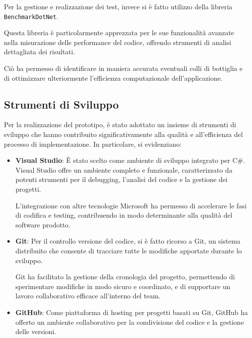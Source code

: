 \documentclass[12pt,a4paper,openright,twoside]{book}
\begin{document}
            Per la gestione e realizzazione dei test, invece si è fatto utilizzo della libreria \texttt{BenchmarkDotNet}.

            Questa libreria è particolarmente apprezzata per le sue funzionalità avanzate nella misurazione delle performance del codice, offrendo strumenti di analisi dettagliata dei risultati.

            Ciò ha permesso di identificare in maniera accurata eventuali colli di bottiglia e di ottimizzare ulteriormente l’efficienza computazionale dell’applicazione.

        \subsection{Strumenti di Sviluppo}

            Per la realizzazione del prototipo, è stato adottato un insieme di strumenti di sviluppo che hanno contribuito significativamente alla qualità e all’efficienza del processo di implementazione. In particolare, si evidenziano:

            \begin{itemize}
                \item \textbf{Visual Studio}: È stato scelto come ambiente di sviluppo integrato per C\#. Visual Studio offre un ambiente completo e funzionale, caratterizzato da potenti strumenti per il debugging, l’analisi del codice e la gestione dei progetti.

                L’integrazione con altre tecnologie Microsoft ha permesso di accelerare le fasi di codifica e testing, contribuendo in modo determinante alla qualità del software prodotto.

                \item \textbf{Git}: Per il controllo versione del codice, si è fatto ricorso a Git, un sistema distribuito che consente di tracciare tutte le modifiche apportate durante lo sviluppo.

                Git ha facilitato la gestione della cronologia del progetto, permettendo di sperimentare modifiche in modo sicuro e coordinato, e di supportare un lavoro collaborativo efficace all'interno del team.

                \item \textbf{GitHub}: Come piattaforma di hosting per progetti basati su Git, GitHub ha offerto un ambiente collaborativo per la condivisione del codice e la gestione delle versioni.
            \end{itemize}
\end{document}
